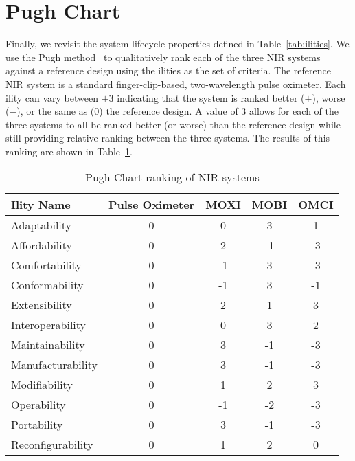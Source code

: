 \section{Pugh Chart}

Finally, we revisit the system lifecycle properties defined in Table~\ref{tab:ilities}. We use the Pugh method~\cite{Pugh1981} to qualitatively rank each of the three \ac{NIR} systems against a reference design using the ilities as the set of criteria. The reference \ac{NIR} system is a standard finger-clip-based, two-wavelength pulse oximeter. Each ility can vary between $\pm3$ indicating that the system is ranked better ($+$), worse ($-$), or the same as ($0$) the reference design. A value of 3 allows for each of the three systems to all be ranked better (or worse) than the reference design while still providing relative ranking between the three systems. The results of this ranking are shown in Table~\ref{tab:pughtable}. 

\begin{table}
\centering
\caption{Pugh Chart ranking of NIR systems}
\label{tab:pughtable}
\begin{tabular}{@{}lcccc@{}}
\toprule
Ility Name        & Pulse Oximeter & MOXI & MOBI & OMCI \\ \midrule
Adaptability      & 0              & 0    & 3    & 1    \\
Affordability     & 0              & 2    & -1   & -3   \\
Comfortability    & 0              & -1   & 3    & -3   \\
Conformability    & 0              & -1   & 3    & -1   \\
Extensibility     & 0              & 2    & 1    & 3    \\
Interoperability  & 0              & 0    & 3    & 2    \\
Maintainability   & 0              & 3    & -1   & -3   \\
Manufacturability & 0              & 3    & -1   & -3   \\
Modifiability     & 0              & 1    & 2    & 3    \\
Operability       & 0              & -1   & -2   & -3   \\
Portability       & 0              & 3    & -1   & -3   \\
Reconfigurability & 0              & 1    & 2    & 0    \\ \bottomrule
\end{tabular}%
\end{table}


